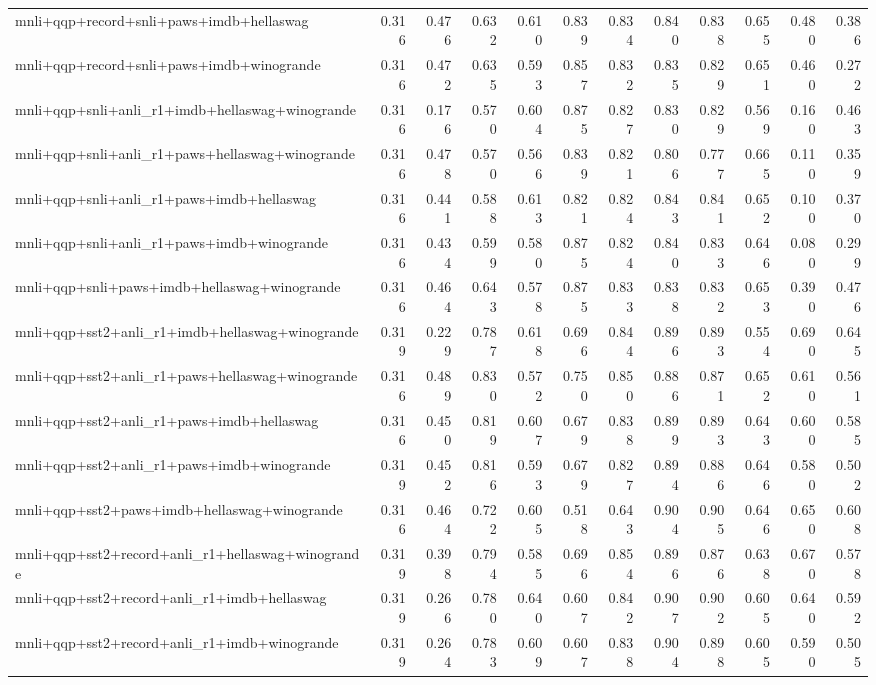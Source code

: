 \begin{table}[t]
\begin{tabular}{lrrrrrrrrrrr}
    mnli+qqp+record+snli+paws+imdb+hellaswag & 0.316 & 0.476 & 0.632 & 0.610 & 0.839 & 0.834 & 0.840 & 0.838 & 0.655 & 0.480 & 0.386 \\
    mnli+qqp+record+snli+paws+imdb+winogrande & 0.316 & 0.472 & 0.635 & 0.593 & 0.857 & 0.832 & 0.835 & 0.829 & 0.651 & 0.460 & 0.272 \\
    mnli+qqp+snli+anli\_r1+imdb+hellaswag+winogrande & 0.316 & 0.176 & 0.570 & 0.604 & 0.875 & 0.827 & 0.830 & 0.829 & 0.569 & 0.160 & 0.463 \\
    mnli+qqp+snli+anli\_r1+paws+hellaswag+winogrande & 0.316 & 0.478 & 0.570 & 0.566 & 0.839 & 0.821 & 0.806 & 0.777 & 0.665 & 0.110 & 0.359 \\
    mnli+qqp+snli+anli\_r1+paws+imdb+hellaswag & 0.316 & 0.441 & 0.588 & 0.613 & 0.821 & 0.824 & 0.843 & 0.841 & 0.652 & 0.100 & 0.370 \\
    mnli+qqp+snli+anli\_r1+paws+imdb+winogrande & 0.316 & 0.434 & 0.599 & 0.580 & 0.875 & 0.824 & 0.840 & 0.833 & 0.646 & 0.080 & 0.299 \\
    mnli+qqp+snli+paws+imdb+hellaswag+winogrande & 0.316 & 0.464 & 0.643 & 0.578 & 0.875 & 0.833 & 0.838 & 0.832 & 0.653 & 0.390 & 0.476 \\
    mnli+qqp+sst2+anli\_r1+imdb+hellaswag+winogrande & 0.319 & 0.229 & 0.787 & 0.618 & 0.696 & 0.844 & 0.896 & 0.893 & 0.554 & 0.690 & 0.645 \\
    mnli+qqp+sst2+anli\_r1+paws+hellaswag+winogrande & 0.316 & 0.489 & 0.830 & 0.572 & 0.750 & 0.850 & 0.886 & 0.871 & 0.652 & 0.610 & 0.561 \\
    mnli+qqp+sst2+anli\_r1+paws+imdb+hellaswag & 0.316 & 0.450 & 0.819 & 0.607 & 0.679 & 0.838 & 0.899 & 0.893 & 0.643 & 0.600 & 0.585 \\
    mnli+qqp+sst2+anli\_r1+paws+imdb+winogrande & 0.319 & 0.452 & 0.816 & 0.593 & 0.679 & 0.827 & 0.894 & 0.886 & 0.646 & 0.580 & 0.502 \\
    mnli+qqp+sst2+paws+imdb+hellaswag+winogrande & 0.316 & 0.464 & 0.722 & 0.605 & 0.518 & 0.643 & 0.904 & 0.905 & 0.646 & 0.650 & 0.608 \\
    mnli+qqp+sst2+record+anli\_r1+hellaswag+winogrande & 0.319 & 0.398 & 0.794 & 0.585 & 0.696 & 0.854 & 0.896 & 0.876 & 0.638 & 0.670 & 0.578 \\
    mnli+qqp+sst2+record+anli\_r1+imdb+hellaswag & 0.319 & 0.266 & 0.780 & 0.640 & 0.607 & 0.842 & 0.907 & 0.902 & 0.605 & 0.640 & 0.592 \\
    mnli+qqp+sst2+record+anli\_r1+imdb+winogrande & 0.319 & 0.264 & 0.783 & 0.609 & 0.607 & 0.838 & 0.904 & 0.898 & 0.605 & 0.590 & 0.505 \\

\end{tabular}
\end{table}
